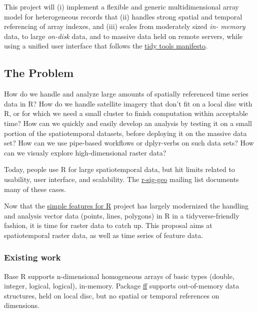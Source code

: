 This project will (i) implement a flexible and generic multidimensional
array model for heterogeneous records that (ii) handles strong spatial
and temporal referencing of array indexes, and (iii) scales from
moderately sized \emph{in- memory} data, to large \emph{on-disk} data,
and to massive data held on remote servers, while using a unified user
interface that follows the
\href{https://cran.r-project.org/web/packages/tidyverse/vignettes/manifesto.html}{tidy
tools manifesto}.

\subsection*{The Problem}\label{the-problem}

How do we handle and analyze large amounts of spatially referenced time
series data in R? How do we handle satellite imagery that don't fit on a
local disc with R, or for which we need a small cluster to finish
computation within acceptable time? How can we quickly and easily
develop an analysis by testing it on a small portion of the
spatiotemporal datasets, before deploying it on the massive data set?
How can we use pipe-based workflows or dplyr-verbs on such data sets?
How can we visualy explore high-dimensional raster data?

Today, people use R for large spatiotemporal data, but hit limits
related to usability, user interface, and scalability. The
\href{https://stat.ethz.ch/pipermail/r-sig-geo/}{r-sig-geo} mailing list
documents many of these cases.

Now that the \href{https://github.com/edzer/sfr}{simple features for R}
project has largely modernized the handling and analysis vector data
(points, lines, polygons) in R in a tidyverse-friendly fashion, it is
time for raster data to catch up. This proposal aims at spatiotemporal
raster data, as well as time series of feature data.

\subsubsection*{Existing work}\label{existing-work}

Base R supports n-dimensional homogeneous arrays of basic types (double,
integer, logical, logical), in-memory. Package
\href{https://CRAN.R-project.org/package=ff}{ff} supports out-of-memory
data structures, held on local disc, but no spatial or temporal
references on dimensions.

